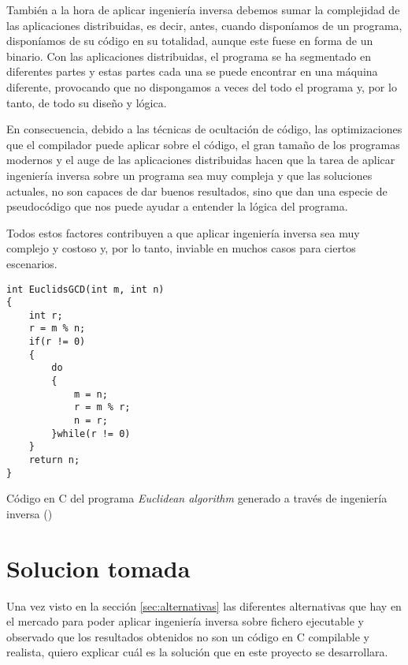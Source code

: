 También a la hora de aplicar ingeniería inversa debemos sumar la complejidad de las aplicaciones
distribuidas, es decir, antes, cuando disponíamos de un programa, disponíamos de su código en
su totalidad, aunque este fuese en forma de un binario. Con las aplicaciones distribuidas, el
programa se ha segmentado en diferentes partes y estas partes cada una se puede encontrar en una
máquina diferente, provocando que no dispongamos a veces del todo el programa y, por lo tanto,
de todo su diseño y lógica.

En consecuencia, debido a las técnicas de ocultación de código, las optimizaciones que el compilador
puede aplicar sobre el código, el gran tamaño de los programas modernos y el auge de las aplicaciones
distribuidas hacen que la tarea de aplicar ingeniería inversa sobre un programa sea muy compleja y
que las soluciones actuales, no son capaces de dar buenos resultados, sino que dan una especie de
pseudocódigo que nos puede ayudar a entender la lógica del programa.

Todos estos factores contribuyen a que aplicar ingeniería inversa sea muy complejo y costoso y, por
lo tanto, inviable en muchos casos para ciertos escenarios.

\begin{mycode}
    \begin{verbatim}
int EuclidsGCD(int m, int n)
{
    int r;
    r = m % n;
    if(r != 0) 
    {
        do
        {
            m = n;
            r = m % r;
            n = r;
        }while(r != 0)
    }
    return n;
}
    \end{verbatim}
    \caption[Código en C del programa \textit{Euclidean algorithm} generado a través de ingeniería inversa]{Código en C del programa \textit{Euclidean algorithm} generado a través de ingeniería inversa (\cite{EuclidianCode})}
    \label{cod:EuclidianCodeIng}
\end{mycode}

\section{Solucion tomada}
\label{sec:solucion}


Una vez visto en la sección \ref{sec:alternativas} las diferentes alternativas que hay
en el mercado para poder aplicar ingeniería inversa sobre fichero ejecutable y observado
que los resultados obtenidos no son un código en C compilable y realista, quiero explicar
cuál es la solución que en este proyecto se desarrollara.

